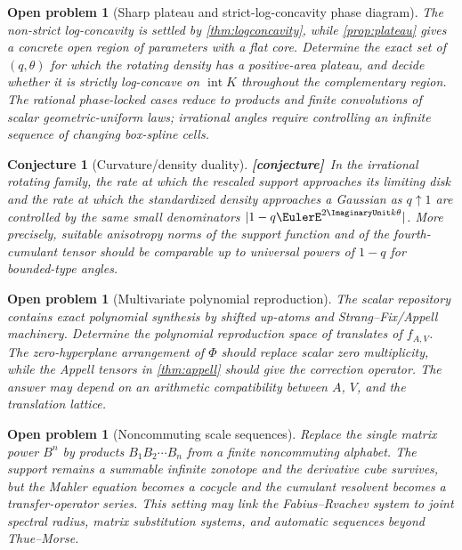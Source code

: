 \documentclass[11pt,oneside]{article}
\newtheorem{conjecture}[theorem]{Conjecture}
\newtheorem{problem}[theorem]{Open problem}
\theoremstyle{definition}
\theoremstyle{remark}
\newcommand{\Conj}{\textcolor{burgundy}{\textbf{[conjecture]}}}
\begin{document}
\begin{problem}[Sharp plateau and strict-log-concavity phase diagram]
\label{prob:plateau-phase}
The non-strict log-concavity is settled by \cref{thm:logconcavity}, while
\cref{prop:plateau} gives a concrete open region of parameters with a flat
core.  Determine the exact set of $(q,\theta)$ for which the rotating density
has a positive-area plateau, and decide whether it is strictly log-concave on
$\operatorname{int}K$ throughout the complementary region.  The rational
phase-locked cases reduce to products and finite convolutions of scalar
geometric-uniform laws; irrational angles require controlling an infinite
sequence of changing box-spline cells.
\end{problem}

\begin{conjecture}[Curvature/density duality]
\label{conj:curvature-density}
\Conj\ In the irrational rotating family, the rate at which the rescaled support
approaches its limiting disk and the rate at which the standardized density
approaches a Gaussian as $q\uparrow1$ are controlled by the same small
denominators $|1-q\EulerE^{2\ImaginaryUnit k\theta}|$.  More precisely, suitable anisotropy norms
of the support function and of the fourth-cumulant tensor should be comparable
up to universal powers of $1-q$ for bounded-type angles.
\end{conjecture}

\begin{problem}[Multivariate polynomial reproduction]
The scalar repository contains exact polynomial synthesis by shifted up-atoms
and Strang--Fix/Appell machinery.  Determine the polynomial reproduction space
of translates of $f_{A,V}$.  The zero-hyperplane arrangement of $\Phi$ should
replace scalar zero multiplicity, while the Appell tensors in
\cref{thm:appell} should give the correction operator.  The answer may depend on
an arithmetic compatibility between $A$, $V$, and the translation lattice.
\end{problem}

\begin{problem}[Noncommuting scale sequences]
Replace the single matrix power $B^n$ by products
$B_1B_2\cdots B_n$ from a finite noncommuting alphabet.  The support remains a
summable infinite zonotope and the derivative cube survives, but the Mahler
equation becomes a cocycle and the cumulant resolvent becomes a transfer-operator
series.  This setting may link the Fabius--Rvachev system to joint spectral
radius, matrix substitution systems, and automatic sequences beyond
Thue--Morse.
\end{problem}
\end{document}
